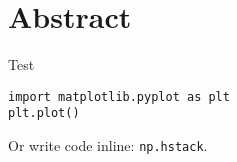\section*{Abstract}
\label{sec:abstract}

Test \cite{https://doi.org/10.48550/arxiv.2303.00750}

\begin{verbatim}
import matplotlib.pyplot as plt
plt.plot()
\end{verbatim}
Or write code inline: \texttt{np.hstack}.